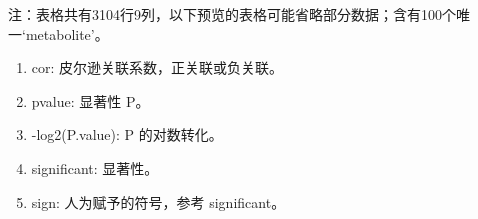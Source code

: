 \documentclass[
]{article}
\providecommand{\tightlist}{%
  \setlength{\itemsep}{0pt}\setlength{\parskip}{0pt}}
\begin{document}
\begin{center}\begin{tcolorbox}[colback=gray!10, colframe=gray!50, width=0.9\linewidth, arc=1mm, boxrule=0.5pt]注：表格共有3104行9列，以下预览的表格可能省略部分数据；含有100个唯一`metabolite'。
\end{tcolorbox}
\end{center}
\begin{center}\begin{tcolorbox}[colback=gray!10, colframe=gray!50, width=0.9\linewidth, arc=1mm, boxrule=0.5pt]\begin{enumerate}\tightlist
\item cor:  皮尔逊关联系数，正关联或负关联。
\item pvalue:  显著性 P。
\item -log2(P.value):  P 的对数转化。
\item significant:  显著性。
\item sign:  人为赋予的符号，参考 significant。
\end{enumerate}\end{tcolorbox}
\end{center}
\end{document}
